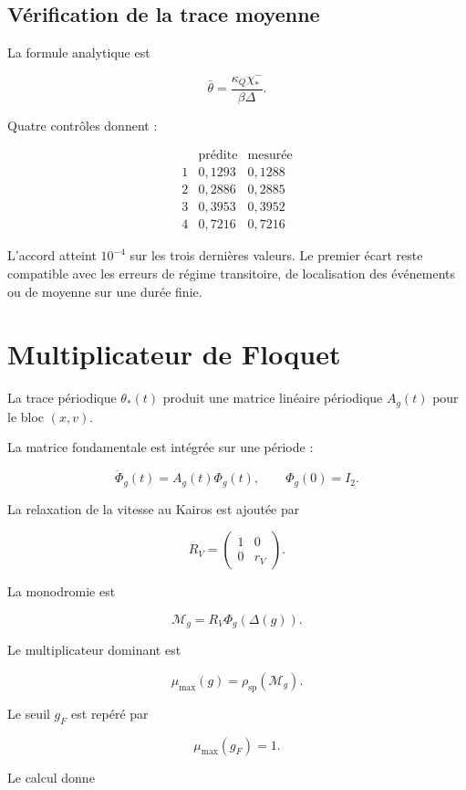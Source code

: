 \subsection{Vérification de la trace moyenne}

La formule analytique est

\[
\bar\theta
=
\frac{\kappa_Q\chi_\ast^-}{\beta\Delta}.
\]

Quatre contrôles donnent :

\[
\begin{array}{c|cc}
 & \text{prédite} & \text{mesurée}\\
\hline
1&0{,}1293&0{,}1288\\
2&0{,}2886&0{,}2885\\
3&0{,}3953&0{,}3952\\
4&0{,}7216&0{,}7216
\end{array}
\]

L'accord atteint \(10^{-4}\) sur les trois dernières valeurs. Le
premier écart reste compatible avec les erreurs de régime transitoire,
de localisation des événements ou de moyenne sur une durée finie.

\section{Multiplicateur de Floquet}
\label{annexe-num-floquet}

La trace périodique \(\theta_\ast(t)\) produit une matrice linéaire
périodique \(A_g(t)\) pour le bloc \((x,v)\).

La matrice fondamentale est intégrée sur une période :

\[
\dot\Phi_g(t)=A_g(t)\Phi_g(t),
\qquad
\Phi_g(0)=I_2.
\]

La relaxation de la vitesse au Kairos est ajoutée par

\[
R_V=
\begin{pmatrix}
1&0\\
0&r_V
\end{pmatrix}.
\]

La monodromie est

\[
\mathcal M_g=R_V\Phi_g(\Delta(g)).
\]

Le multiplicateur dominant est

\[
\mu_{\max}(g)=\rho_{\mathrm{sp}}(\mathcal M_g).
\]

Le seuil \(g_F\) est repéré par

\[
\mu_{\max}(g_F)=1.
\]

Le calcul donne

